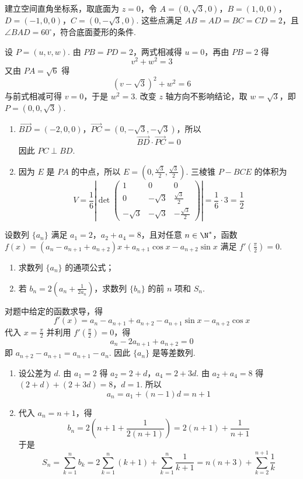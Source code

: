 \begin{solution}
建立空间直角坐标系，取底面为 \(z=0\)，令
\(A=(0,\sqrt3,0)\)，\(B=(1,0,0)\)，\(D=(-1,0,0)\)，\(C=(0,-\sqrt3,0)\).
这些点满足 \(AB=AD=BC=CD=2\)，且 \(\angle BAD=60^\circ\)，符合底面菱形的条件.

设 \(P=(u,v,w)\). 由 \(PB=PD=2\)，两式相减得 \(u=0\)，再由 \(PB=2\) 得
\[
v^2+w^2=3
\]
又由 \(PA=\sqrt6\) 得
\[
(v-\sqrt3)^2+w^2=6
\]
与前式相减可得 \(v=0\)，于是 \(w^2=3\). 改变 \(z\) 轴方向不影响结论，取 \(w=\sqrt3\)，即 \(P=(0,0,\sqrt3)\).

\begin{enumerate}
\item \(\overrightarrow{BD}=(-2,0,0)\)，\(\overrightarrow{PC}=(0,-\sqrt3,-\sqrt3)\)，所以
\[
\overrightarrow{BD}\cdot\overrightarrow{PC}=0
\]
因此 \(PC\perp BD\).

\item 因为 \(E\) 是 \(PA\) 的中点，所以 \(E=(0,\frac{\sqrt3}{2},\frac{\sqrt3}{2})\). 三棱锥 \(P-BCE\) 的体积为
\[
V=\frac16\left|\det
\begin{pmatrix}
1&0&0\\
0&-\sqrt3&\frac{\sqrt3}{2}\\
-\sqrt3&-\sqrt3&-\frac{\sqrt3}{2}
\end{pmatrix}\right|
=\frac16\cdot3=\frac12
\]
\end{enumerate}
\end{solution}

\begin{problem}
设数列 \(\{a_{n}\}\) 满足 \(a_{1} = 2\)，\(a_{2} + a_{4} = 8\)，且对任意 \(n \in \N^{*}\)，函数
\(f(x) = (a_{n} - a_{n+1} + a_{n+2})x + a_{n+1}\cos x - a_{n+2}\sin x\)
满足 \(f'\!\left(\frac{\pi}{2}\right) = 0\).

\begin{enumerate}
\item 求数列 \(\{a_{n}\}\) 的通项公式；
\item 若 \(b_{n} = 2\left(a_{n} + \frac{1}{2a_{n}}\right)\)，求数列 \(\{b_{n}\}\) 的前 \(n\) 项和 \(S_{n}\).
\end{enumerate}
\end{problem}

\begin{solution}
对题中给定的函数求导，得
\[
f'(x)=a_n-a_{n+1}+a_{n+2}-a_{n+1}\sin x-a_{n+2}\cos x
\]
代入 \(x=\frac\pi2\) 并利用 \(f'\left(\frac\pi2\right)=0\)，得
\[
a_n-2a_{n+1}+a_{n+2}=0
\]
即 \(a_{n+2}-a_{n+1}=a_{n+1}-a_n\). 因此 \(\{a_n\}\) 是等差数列.

\begin{enumerate}
\item 设公差为 \(d\). 由 \(a_1=2\) 得 \(a_2=2+d\)，\(a_4=2+3d\). 由 \(a_2+a_4=8\) 得
\((2+d)+(2+3d)=8\)，\(d=1\).
所以
\[
a_n=a_1+(n-1)d=n+1
\]

\item 代入 \(a_n=n+1\)，得
\[
b_n=2\left(n+1+\frac1{2(n+1)}\right)=2(n+1)+\frac1{n+1}
\]
于是
\[
S_n=\sum_{k=1}^n b_k
=2\sum_{k=1}^n(k+1)+\sum_{k=1}^n\frac1{k+1}
=n(n+3)+\sum_{k=2}^{n+1}\frac1k
\]
\end{enumerate}
\end{solution}

